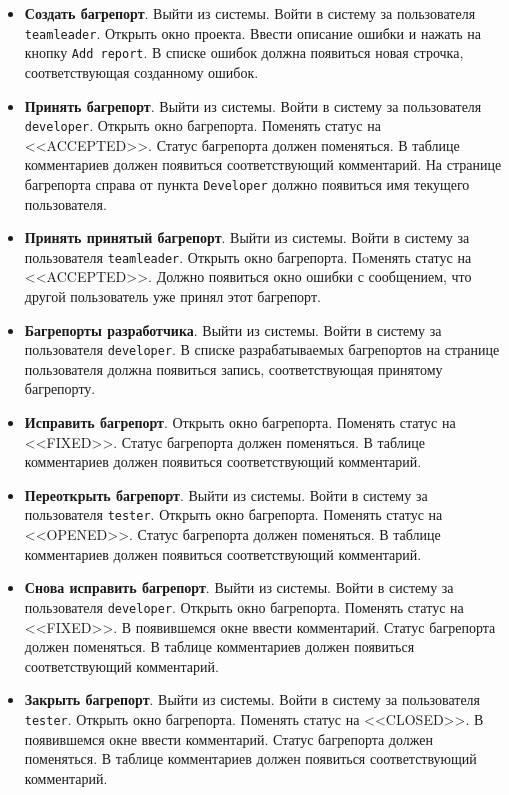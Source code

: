 \begin{itemize}
\item \textbf{Создать багрепорт}. Выйти из системы. Войти в систему за пользователя \texttt{teamleader}. Открыть окно проекта. Ввести описание ошибки и нажать на кнопку \texttt{Add report}. В списке ошибок должна появиться новая строчка, соответствующая созданному ошибок.

\item \textbf{Принять багрепорт}. Выйти из системы. Войти в систему за пользователя \texttt{developer}. Открыть окно багрепорта. Поменять статус на <<ACCEPTED>>. Статус багрепорта должен поменяться. В таблице комментариев должен появиться соответствующий комментарий. На странице багрепорта справа от пункта \texttt{Developer} должно появиться имя текущего пользователя.

\item \textbf{Принять принятый багрепорт}. Выйти из системы. Войти в систему за пользователя \texttt{teamleader}. Открыть окно багрепорта. Пoменять статус на <<ACCEPTED>>. Должно появиться окно ошибки с сообщением, что другой пользователь уже принял этот багрепорт.

\item \textbf{Багрепорты разработчика}. Выйти из системы. Войти в систему за пользователя \texttt{developer}. В списке разрабатываемых багрепортов на странице пользователя должна появиться запись, соответствующая принятому багрепорту.

\item \textbf{Исправить багрепорт}. Открыть окно багрепорта. Поменять статус на <<FIXED>>. Статус багрепорта должен поменяться. В таблице комментариев должен появиться соответствующий комментарий.

\item \textbf{Переоткрыть багрепорт}. Выйти из системы. Войти в систему за пользователя \texttt{tester}. Открыть окно багрепорта. Поменять статус на <<OPENED>>. Статус багрепорта должен поменяться. В таблице комментариев должен появиться соответствующий комментарий.

\item \textbf{Снова исправить багрепорт}. Выйти из системы. Войти в систему за пользователя \texttt{developer}. Открыть окно багрепорта. Поменять статус на <<FIXED>>. В появившемся окне ввести комментарий. Статус багрепорта должен поменяться. В таблице комментариев должен появиться соответствующий комментарий.

\item \textbf{Закрыть багрепорт}. Выйти из системы. Войти в систему за пользователя \texttt{tester}. Открыть окно багрепорта. Поменять статус на <<CLOSED>>. В появившемся окне ввести комментарий. Статус багрепорта должен поменяться. В таблице комментариев должен появиться соответствующий комментарий.
\end{itemize}

